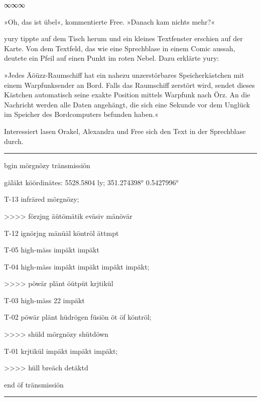\begin{center}
    ∞∞∞
\end{center}

»Oh, das ist übel«, kommentierte Free. »Danach kam nichts mehr?«

yury tippte auf dem Tisch herum und ein kleines Textfenster erschien auf der Karte. Von dem Textfeld, das wie eine Sprechblase in einem Comic aussah, deutete ein Pfeil auf einen Punkt im roten Nebel. Dazu erklärte yury:

»Jedes Äöüzz-Raumschiff hat ein nahezu unzerstörbares Speicherkästchen mit einem Warpfunksender an Bord. Falls das Raumschiff zerstört wird, sendet dieses Kästchen automatisch seine exakte Position mittels Warpfunk nach Örz. An die Nachricht werden alle Daten angehängt, die sich eine Sekunde vor dem Unglück im Speicher des Bordcomputers befunden haben.«

Interessiert lasen Orakel, Alexandra und Free sich den Text in der Sprechblase durch.

\noindent \parbox{\textwidth}{ \vspace{3ex} \hrule \vspace{3ex}

    \begin{footnotesize}
    \begin{ttfamily}

\noindent bgin mörgnözy tränsmissiön

\noindent gäläkt köördinätes: 5528.5804 ly; 351.274398° 0.5427996°

\noindent T-13 infräred mörgnözy;

\noindent >>>> förzjng äütömätik eväsiv mänövär

\noindent T-12 ignörjng mänüäl köntröl ättmpt

\noindent T-05 high-mäss impäkt impäkt

\noindent T-04 high-mäss impäkt impäkt impäkt impäkt;

\noindent >>>> pöwär plänt öütpüt krjtikül

\noindent T-03 high-mäss 22 impäkt

\noindent T-02 pöwär plänt hüdrögen füsiön öt öf köntröl;

\noindent >>>> shüld mörgnözy shütdöwn

\noindent T-01 krjtikül impäkt impäkt impäkt;

\noindent >>>>  hüll breäch detäktd

\noindent end öf tränsmissiön

    \end{ttfamily}
    \end{footnotesize}

\vspace{3ex} \hrule \vspace{3ex} }

